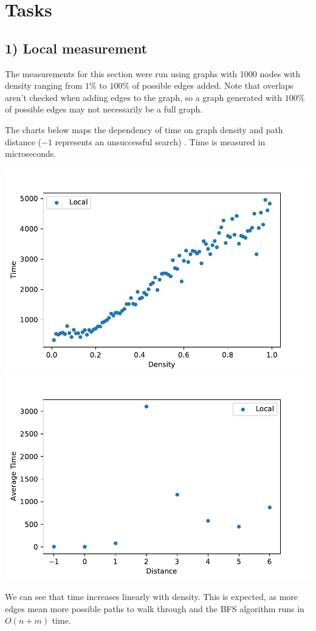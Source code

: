 \documentclass{scrartcl}
\begin{document}
    \section*{Tasks}
    \subsection*{1) Local measurement}
    The measurements for this section were run using graphs with 1000 nodes with density ranging from $1\%$ to $100\%$ of possible edges added. Note that overlaps aren't checked when adding edges to the graph, so a graph generated with $100\%$ of possible edges may not necessarily be a full graph.

    The charts below maps the dependency of time on graph density and path distance ($-1$ represents an unsuccessful search) . Time is measured in microseconds.
    \begin{center}
        \includegraphics[width=0.8\linewidth]{picture.pdf}
        \includegraphics[width=0.8\linewidth]{picture_dist.pdf}
    \end{center}
    We can see that time increases linearly with density. This is expected, as more edges mean more possible paths to walk through and the BFS algorithm runs in $O(n+m)$ time.
\end{document}
